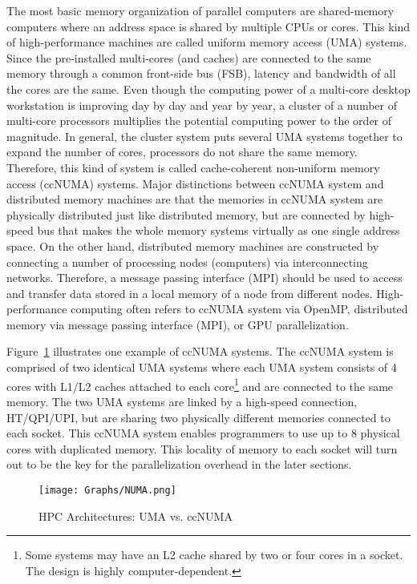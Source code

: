 \documentclass[12pt]{article}
\begin{document}
The most basic memory organization of parallel computers are shared-memory computers where an address space is shared by multiple CPUs or cores. This kind of high-performance machines are called uniform memory access (UMA) systems. Since the pre-installed multi-cores (and caches) are connected to the same memory through a common front-side bus (FSB), latency and bandwidth of all the cores are the same. Even though the computing power of a multi-core desktop workstation is improving day by day and year by year, a cluster of a number of multi-core processors multiplies the potential computing power to the order of magnitude. In general, the cluster system puts several UMA systems together to expand the number of cores, processors do not share the same memory. Therefore, this kind of system is called cache-coherent non-uniform memory access (ccNUMA) systems. Major distinctions between ccNUMA system and distributed memory machines are that the memories in ccNUMA system are physically distributed just like distributed memory, but are connected by high-speed bus that makes the whole memory systems virtually as one single address space. On the other hand, distributed memory machines are constructed by connecting a number of processing nodes (computers) via interconnecting networks. Therefore, a message passing interface (MPI) should be used to access and transfer data stored in a local memory of a node from different nodes. High-performance computing often refers to ccNUMA system via OpenMP, distributed memory via message passing interface (MPI), or GPU parallelization.

Figure~\ref{fig:numa} illustrates one example of ccNUMA systems. The ccNUMA system is comprised of two identical UMA systems where each UMA system consists of 4 cores with L1/L2 caches attached to each core\footnote{\sf Some systems may have an L2 cache shared by two or four cores in a socket. The design is highly computer-dependent.} and are connected to the same memory. The two UMA systems are linked by a high-speed connection, HT/QPI/UPI, but are sharing two physically different memories connected to each socket. This ccNUMA system enables programmers to use up to 8 physical cores with duplicated memory. This locality of memory to each socket will turn out to be the key for the parallelization overhead in the later sections.
\begin{figure}[t!]
\begin{center}
\caption{\sf HPC Architectures: UMA vs. ccNUMA}
\texttt{[image: Graphs/NUMA.png]}\label{fig:numa}
\end{center}
\end{figure}
\end{document}
